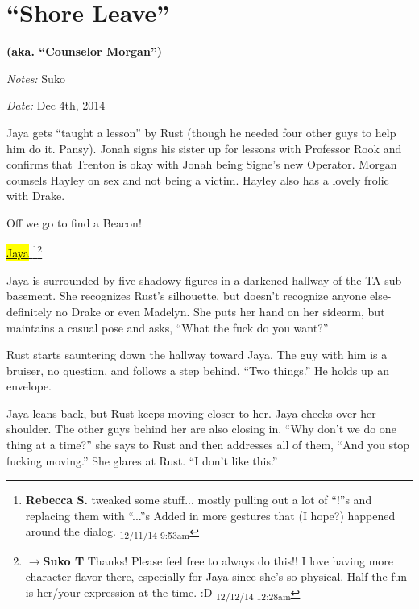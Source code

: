 \setcounter{chapter}{ 37 }
\chapter{\textbf{``Shore Leave''} }




\begin{center}
 {\LARGE \textbf{(aka. ``Counselor Morgan'')} } 
\end{center}




\textit{Notes:} Suko

\textit{Date:} Dec 4th, 2014



Jaya gets ``taught a lesson'' by Rust (though he needed four other guys to help him do it. Pansy). Jonah signs his sister up for lessons with Professor Rook and confirms that Trenton is okay with Jonah being Signe's new Operator.  Morgan counsels Hayley on sex and not being a victim.  Hayley also has a lovely frolic with Drake.



Off we go to find a Beacon!



\noindent\hrulefill






\underline{ \hl{Jaya} }\footnote{\textbf{Rebecca S. }tweaked some stuff... mostly pulling out a lot of ``!''s and replacing them with ``...''s  Added in more gestures that (I hope?) happened around the dialog. \textsubscript{12/11/14 9:53am}}\footnote{$\rightarrow$\textbf{Suko T }Thanks!  Please feel free to always do this!!  I love having more character flavor there, especially for Jaya since she's so physical. Half the fun is her/your expression at the time. :D \textsubscript{12/12/14 12:28am}}

Jaya is surrounded by five shadowy figures in a darkened hallway of the TA sub basement.  She recognizes Rust's silhouette, but doesn't recognize anyone else- definitely no Drake or even Madelyn.  She puts her hand on her sidearm, but maintains a casual pose and asks, ``What the fuck do you want?''

Rust starts sauntering down the hallway toward Jaya.  The guy with him is a bruiser, no question, and follows a step behind.  ``Two things.''  He holds up an envelope.

Jaya leans back, but Rust keeps moving closer to her.  Jaya checks over her shoulder.  The other guys behind her are also closing in.  ``Why don't we do one thing at a time?'' she says to Rust and then addresses all of them, ``And you stop fucking moving.''  She glares at Rust.  ``I don't like this.''

